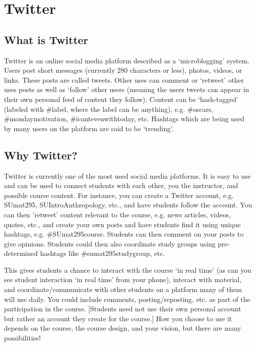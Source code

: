 \newpage
\section{Twitter}

\subsection{What is Twitter}

Twitter is an online social media platform described as a `microblogging' system. Users post short messages (currently 280 characters or less), photos, videos, or links. These posts are called tweets. Other uses can comment or `retweet' other uses posts as well as `follow' other users (meaning the users tweets can appear in their own personal feed of content they follow). Content can be `hash-tagged' (labeled with \#label, where the label can be anything), e.g. \#oscars, \#mondaymotivation, \#icantevenwithtoday, etc. Hashtags which are being used by many users on the platform are said to be `trending'. 



\subsection{Why Twitter?}

Twitter is currently one of the most used social media platforms. It is easy to use and can be used to connect students with each other, you the instructor, and possible course content. For instance, you can create a Twitter account, e.g. SUmat295, SUIntroAnthropology, etc., and have students follow the account. You can then 'retweet' content relevant to the course, e.g. news articles, videos, quotes, etc., and create your own posts and have students find it using unique hashtags, e.g. \#SUmat295course. Students can then comment on your posts to give opinions. Students could then also coordinate study groups using pre-determined hashtags like \#sumat295studygroup, etc. 

This gives students a chance to interact with the course `in real time' (as can you see student interaction `in real time' from your phone), interact with material, and coordinate/communicate with other students on a platform many of them will use daily. You could include comments, posting/reposting, etc. as part of the participation in the course. [Students need not use their own personal account but rather an account they create for the course.] How you choose to use it depends on the course, the course design, and your vision, but there are many possibilities! 




